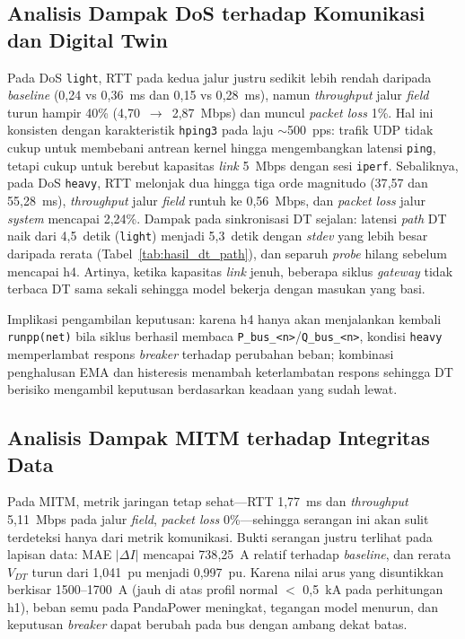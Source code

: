 \subsection{Analisis Dampak DoS terhadap Komunikasi dan Digital Twin}
\label{subsec:analisis_dampak_dos}
Pada \ac{DoS} \texttt{light}, RTT pada kedua jalur justru sedikit lebih rendah daripada \textit{baseline} (0{,}24 vs 0{,}36~ms dan 0{,}15 vs 0{,}28~ms), namun \textit{throughput} jalur \textit{field} turun hampir 40\% (4{,}70~$\to$~2{,}87~Mbps) dan muncul \textit{packet loss} 1\%. Hal ini konsisten dengan karakteristik \texttt{hping3} pada laju $\sim$500~pps: trafik UDP tidak cukup untuk membebani antrean kernel hingga mengembangkan latensi \texttt{ping}, tetapi cukup untuk berebut kapasitas \textit{link} 5~Mbps dengan sesi \texttt{iperf}. Sebaliknya, pada \ac{DoS} \texttt{heavy}, RTT melonjak dua hingga tiga orde magnitudo (37{,}57 dan 55{,}28~ms), \textit{throughput} jalur \textit{field} runtuh ke 0{,}56~Mbps, dan \textit{packet loss} jalur \textit{system} mencapai 2{,}24\%. Dampak pada sinkronisasi \ac{DT} sejalan: latensi \textit{path} \ac{DT} naik dari 4{,}5~detik (\texttt{light}) menjadi 5{,}3~detik dengan \textit{stdev} yang lebih besar daripada rerata (Tabel~\ref{tab:hasil_dt_path}), dan separuh \textit{probe} hilang sebelum mencapai h4. Artinya, ketika kapasitas \textit{link} jenuh, beberapa siklus \textit{gateway} tidak terbaca \ac{DT} sama sekali sehingga model bekerja dengan masukan yang basi.

Implikasi pengambilan keputusan: karena h4 hanya akan menjalankan kembali \texttt{runpp(net)} bila siklus berhasil membaca \texttt{P\_bus\_<n>}/\texttt{Q\_bus\_<n>}, kondisi \texttt{heavy} memperlambat respons \textit{breaker} terhadap perubahan beban; kombinasi penghalusan EMA dan histeresis menambah keterlambatan respons sehingga \ac{DT} berisiko mengambil keputusan berdasarkan keadaan yang sudah lewat.

\subsection{Analisis Dampak MITM terhadap Integritas Data}
\label{subsec:analisis_dampak_mitm}
Pada \ac{MITM}, metrik jaringan tetap sehat---RTT 1{,}77~ms dan \textit{throughput} 5{,}11~Mbps pada jalur \textit{field}, \textit{packet loss} 0\%---sehingga serangan ini akan sulit terdeteksi hanya dari metrik komunikasi. Bukti serangan justru terlihat pada lapisan data: MAE $|\Delta I|$ mencapai 738{,}25~A relatif terhadap \textit{baseline}, dan rerata $V_{DT}$ turun dari 1{,}041~pu menjadi 0{,}997~pu. Karena nilai arus yang disuntikkan berkisar 1500--1700~A (jauh di atas profil normal $<$ 0{,}5~kA pada perhitungan h1), beban semu pada PandaPower meningkat, tegangan model menurun, dan keputusan \textit{breaker} dapat berubah pada bus dengan ambang dekat batas.

